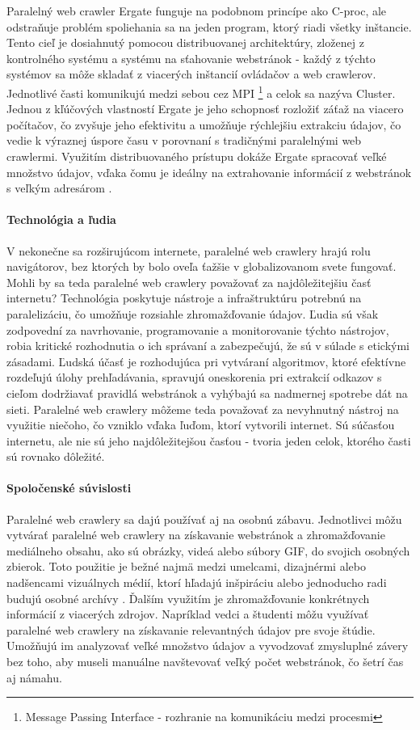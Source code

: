 \documentclass[10pt,twoside,slovak,a4paper]{article}
\begin{document}
Paralelný web crawler Ergate funguje na podobnom princípe ako C-proc, ale odstraňuje problém spoliehania sa na jeden program, ktorý riadi všetky inštancie. Tento cieľ je dosiahnutý pomocou distribuovanej architektúry, zloženej z kontrolného systému a systému na sťahovanie webstránok - každý z týchto systémov sa môže skladať z viacerých inštancií ovládačov a web crawlerov. Jednotlivé časti komunikujú medzi sebou cez MPI \footnote{Message Passing Interface - rozhranie na komunikáciu medzi procesmi} a celok sa nazýva Cluster. Jednou z kľúčových vlastností Ergate je jeho schopnosť rozložiť záťaž na viacero počítačov, čo zvyšuje jeho efektivitu a umožňuje rýchlejšiu extrakciu údajov, čo vedie k výraznej úspore času v porovnaní s tradičnými paralelnými web crawlermi. Využitím distribuovaného prístupu dokáže Ergate spracovať veľké množstvo údajov, vďaka čomu je ideálny na extrahovanie informácií z webstránok s veľkým adresárom \cite{5709184}.

\paragraph{Technológia a ľudia}

V nekonečne sa rozširujúcom internete, paralelné web crawlery hrajú rolu navigátorov, bez ktorých by bolo oveľa ťažšie v globalizovanom svete fungovať. Mohli by sa teda paralelné web crawlery považovať za najdôležitejšiu časť internetu? Technológia poskytuje nástroje a infraštruktúru potrebnú na paralelizáciu, čo umožňuje rozsiahle zhromažďovanie údajov. Ľudia sú však zodpovední za navrhovanie, programovanie a monitorovanie týchto nástrojov, robia kritické rozhodnutia o ich správaní a zabezpečujú, že sú v súlade s etickými zásadami. Ľudská účasť je rozhodujúca pri vytváraní algoritmov, ktoré efektívne rozdeľujú úlohy prehľadávania, spravujú oneskorenia pri extrakcií odkazov s cieľom dodržiavať pravidlá webstránok a vyhýbajú sa nadmernej spotrebe dát na sieti. Paralelné web crawlery môžeme teda považovať za nevyhnutný nástroj na využitie niečoho, čo vzniklo vďaka ľuďom, ktorí vytvorili internet. Sú súčasťou internetu, ale nie sú jeho najdôležitejšou časťou - tvoria jeden celok, ktorého časti sú rovnako dôležité.

\paragraph{Spoločenské súvislosti}

Paralelné web crawlery sa dajú používať aj na osobnú zábavu. Jednotlivci môžu vytvárať paralelné web crawlery na získavanie webstránok a zhromažďovanie mediálneho obsahu, ako sú obrázky, videá alebo súbory GIF, do svojich osobných zbierok. Toto použitie je bežné najmä medzi umelcami, dizajnérmi alebo nadšencami vizuálnych médií, ktorí hľadajú inšpiráciu alebo jednoducho radi budujú osobné archívy \cite{pennock2013web}. Ďalším využitím je zhromažďovanie konkrétnych informácií z viacerých zdrojov. Napríklad vedci a študenti môžu využívať paralelné web crawlery na získavanie relevantných údajov pre svoje štúdie. Umožňujú im analyzovať veľké množstvo údajov a vyvodzovať zmysluplné závery bez toho, aby museli manuálne navštevovať veľký počet webstránok, čo šetrí čas aj námahu.
\end{document}
